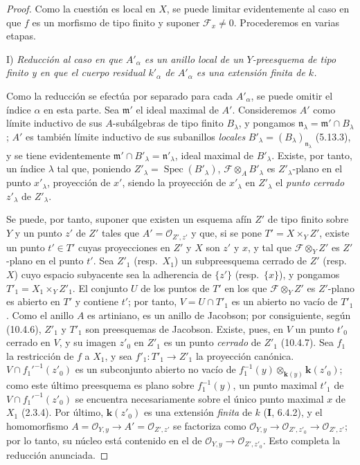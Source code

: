 \begin{proof}
Como la cuestión es local en $X$, se puede limitar evidentemente al caso en que $f$ es
un morfismo de tipo finito y suponer $\mathcal F_x\neq0$. Procederemos en varias etapas.

\medskip
\noindent I) \emph{Reducción al caso en que $A'_\alpha$ es un anillo local de un $Y$-preesquema de tipo finito y en que el
cuerpo residual $k'_\alpha$ de $A'_\alpha$ es una extensión finita de $k$.}

\medskip
Como la reducción se efectúa por separado para cada $A'_\alpha$, se puede omitir el índice $\alpha$ en
esta parte. Sea $\mathfrak m'$ el ideal maximal de $A'$. Consideremos $A'$ como
límite inductivo de sus $A$-subálgebras de tipo finito $B_\lambda$, y pongamos $\mathfrak n_\lambda=\mathfrak m'\cap B_\lambda$; $A'$ es también
límite inductivo de sus subanillos \emph{locales} $B'_\lambda=(B_\lambda)_{\mathfrak n_\lambda}$ (5.13.3), y se tiene evidentemente
$\mathfrak m'\cap B'_\lambda=\mathfrak n'_\lambda$, ideal maximal de $B'_\lambda$. Existe, por tanto,  un índice $\lambda$ tal que, poniendo
$Z'_\lambda=\operatorname{Spec}(B'_\lambda)$, $\mathcal F\otimes_A B'_\lambda$ es $Z'_\lambda$-plano en el punto $x'_\lambda$, proyección de $x'$, siendo la proyección
de $x'_\lambda$ en $Z'_\lambda$ el \emph{punto cerrado} $z'_\lambda$ de $Z'_\lambda$.

Se puede, por tanto, suponer que existen un esquema afín $Z'$ de tipo finito sobre $Y$ y un
punto $z'$ de $Z'$ tales que $A'=\mathcal O_{Z',z'}$ y que, si se pone $T'=X\times_Y Z'$, existe un punto
$t'\in T'$ cuyas proyecciones en $Z'$ y $X$ son $z'$ y $x$, y tal que $\mathcal F\otimes_Y Z'$ es $Z'$-plano en el
punto $t'$. Sea $Z'_1$ (resp.\ $X_1$) un subpreesquema cerrado de $Z'$ (resp.\ $X$) cuyo espacio subyacente sea
la adherencia de $\{z'\}$ (resp.\ $\{x\}$), y pongamos $T'_1=X_1\times_Y Z'_1$. El conjunto $U$ de los
puntos de $T'$ en los que $\mathcal F\otimes_Y Z'$ es $Z'$-plano es abierto en $T'$  y contiene $t'$; por tanto,
$V=U\cap T'_1$ es un abierto no vacío de $T'_1$. Como el anillo $A$ es artiniano, es un anillo de Jacobson;
por consiguiente, según (10.4.6), $Z'_1$ y $T'_1$ son preesquemas de Jacobson. Existe, pues,
en $V$ un punto $t'_0$ cerrado en $V$, y su imagen $z'_0$ en $Z'_1$ es un punto \emph{cerrado} de $Z'_1$ (10.4.7).
Sea $f_1$ la restricción de $f$ a $X_1$, y sea $f'_1:T'_1\to Z'_1$ la proyección canónica.
$V\cap f_1'^{-1}(z'_0)$ es un subconjunto abierto no vacío de
$f_1^{-1}(y)\otimes_{\mathbf{k}(y)}\boldsymbol{k}(z'_0)$; como este último preesquema es plano sobre $f_1^{-1}(y)$, un punto maximal $t'_1$ de
$V\cap f_1'^{-1}(z'_0)$ se encuentra necesariamente sobre el único punto maximal $x$ de $X_1$ (2.3.4).
Por último, $\boldsymbol{k}(z'_0)$ es una extensión \emph{finita} de $k$ (\textbf I, 6.4.2), y el homomorfismo
$A=\mathcal O_{Y,y}\to A'=\mathcal O_{Z',z'}$ se factoriza como
$\mathcal O_{Y,y}\to\mathcal O_{Z',z'_0}\to\mathcal O_{Z',z'}$; por lo tanto, su núcleo está contenido en el de
$\mathcal O_{Y,y}\to\mathcal O_{Z',z'_0}$. Esto completa la reducción anunciada.


\end{proof}
